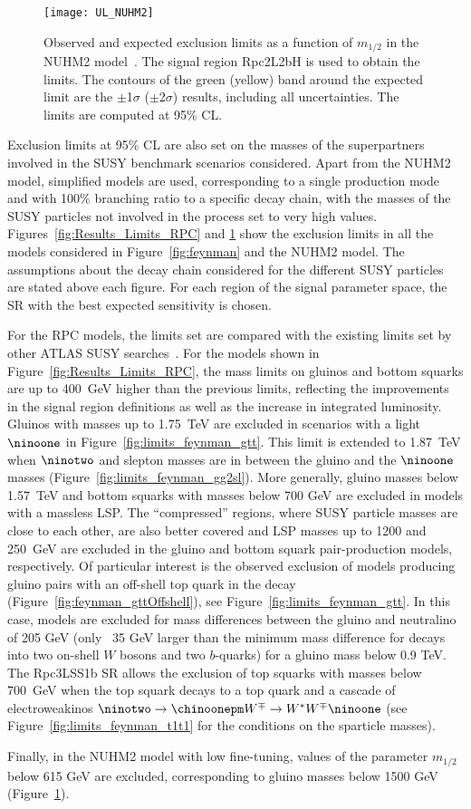 \begin{figure}[b]
\centering
\texttt{[image: UL\_NUHM2]}\label{fig:limits_feynman_nuhm2}
\caption{Observed and expected exclusion limits as a function of $m_{1/2}$ in the NUHM2 model~\cite{Ellis:2002iu,Ellis:2002wv}.
The signal region Rpc2L2bH is used to obtain the limits. 
The contours of the green (yellow) band around the expected limit are the $\pm$1$\sigma$ ($\pm$2$\sigma$) results, including all uncertainties. The limits are computed at 95\% CL.}
\label{fig:Results_Limits_NUHM2} 
\end{figure} 

Exclusion limits at 95\% CL are also set on the masses of the superpartners involved in the SUSY benchmark scenarios considered. 
Apart from the NUHM2 model, simplified models are used, corresponding to a single production mode and with 100\% branching ratio to a specific decay chain, 
with the masses of the SUSY particles not involved in the process set to very high values. 
Figures~\ref{fig:Results_Limits_RPC} and \ref{fig:Results_Limits_NUHM2} show the exclusion limits in all 
the models considered in Figure~\ref{fig:feynman} and the NUHM2 model. The assumptions about the decay chain considered for the different SUSY particles are 
stated above each figure. For each region of the signal parameter space, the SR with the best expected sensitivity is chosen.

For the RPC models, the limits set are compared with the existing limits set by other ATLAS SUSY 
searches~\cite{paperSS3L,Aad:2016jxj}. For the models shown in Figure~\ref{fig:Results_Limits_RPC}, 
the mass limits on gluinos and bottom squarks are up to 400~GeV higher than the previous limits, reflecting the improvements 
in the signal region definitions as well as the increase in integrated luminosity. Gluinos with masses up to 1.75~TeV
are excluded in scenarios with a light $\ninoone$ in Figure~\ref{fig:limits_feynman_gtt}. This limit is extended to 1.87~TeV when 
$\ninotwo$ and slepton masses are in between the gluino and the $\ninoone$ masses (Figure~\ref{fig:limits_feynman_gg2sl}). More generally, gluino masses 
below 1.57~TeV and bottom squarks with masses below 700 GeV 
are excluded in models with a massless LSP. The ``compressed'' regions, where SUSY particle masses are close to each other, are also better covered 
and LSP masses up to 1200 and 250~GeV are excluded in the gluino and bottom squark pair-production models, respectively. Of particular
interest is the observed exclusion of models producing gluino pairs with an off-shell top quark in the decay (Figure~\ref{fig:feynman_gttOffshell}), 
see Figure~\ref{fig:limits_feynman_gtt}. In this case, models are excluded for mass differences between the gluino and neutralino of 205 GeV (only ~35 GeV
larger than the minimum mass difference for decays into two on-shell $W$ bosons and two $b$-quarks) for a gluino mass below 0.9
TeV. The Rpc3LSS1b SR allows the exclusion of top squarks with masses below 700~GeV when the top squark decays to a top quark and a cascade of electroweakinos 
$\ninotwo \to \chinoonepm W^{\mp} \to W^{*} W^{\mp} \ninoone$ (see Figure~\ref{fig:limits_feynman_t1t1} for the conditions 
on the sparticle masses).


Finally, in the NUHM2 model with low fine-tuning, values of the parameter $m_{1/2}$ below 615 GeV are excluded, 
corresponding to gluino masses below 1500 GeV (Figure~\ref{fig:Results_Limits_NUHM2}).
